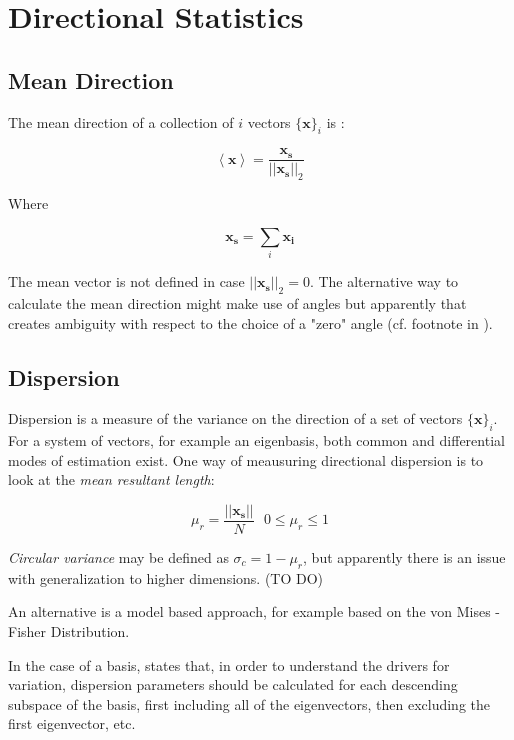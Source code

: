 \section{Directional Statistics}

\subsection{Mean Direction}
The mean direction of a collection of $i$ vectors $\{\mathbf{x}\}_i$ is \cite{damask2019consistent}:

\begin{equation}
\left<\mathbf{x}\right> = \frac{\mathbf{x_s}}{||\mathbf{x_s}||_2}
\end{equation}

Where

\begin{equation}
\mathbf{x_s} = \sum_i \mathbf{x_i}
\end{equation}

The mean vector is not defined in case $||\mathbf{x_s}||_2 = 0$. The alternative way to calculate the mean direction might make use of angles but apparently that creates ambiguity with respect to the choice of a "zero" angle (cf. footnote in ).



\subsection{Dispersion}

Dispersion is a measure of the variance on the direction of a set of vectors $\{\mathbf{x}\}_i$. For a system of vectors, for example an eigenbasis, both common and differential modes of estimation exist. One way of meausuring directional dispersion is to look at the \textit{mean resultant length}:

\begin{equation}
\mu_r = \frac{||\mathbf{x_s}||}{N}\ \ \ 0\leq \mu_r \leq 1
\end{equation}

\textit{Circular variance} may be defined as $\sigma_c = 1-\mu_r$, but apparently there is an issue with generalization to higher dimensions. (TO DO)

An alternative is a model based approach, for example based on the von Mises - Fisher Distribution.

In the case of a basis,  states that, in order to understand the drivers for variation, dispersion parameters should be calculated for each descending subspace of the basis, first including all of the eigenvectors, then excluding the first eigenvector, etc.



